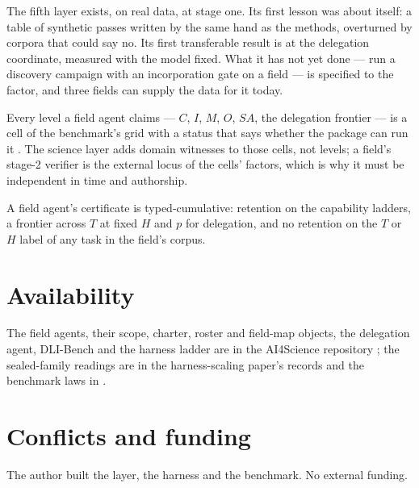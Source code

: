 \documentclass[11pt]{article}
\theoremstyle{definition}
\begin{document}
The fifth layer exists, on real data, at stage one. Its first lesson was about itself: a table of synthetic passes written by the same hand as the methods, overturned by corpora that could say no. Its first transferable result is at the delegation coordinate, measured with the model fixed. What it has not yet done --- run a discovery campaign with an incorporation gate on a field --- is specified to the factor, and three fields can supply the data for it today.

Every level a field agent claims --- $C$, $I$, $M$, $O$, $SA$, the delegation frontier --- is a cell of the benchmark's grid with a status that says whether the package can run it \citep{yang2026hilbenchpaper}. The science layer adds domain witnesses to those cells, not levels; a field's stage-2 verifier is the external locus of the cells' factors, which is why it must be independent in time and authorship.

A field agent's certificate is typed-cumulative: retention on the capability ladders, a frontier across $T$ at fixed $H$ and $p$ for delegation, and no retention on the $T$ or $H$ label of any task in the field's corpus.

\section*{Availability}

The field agents, their scope, charter, roster and field-map objects, the delegation agent, DLI-Bench and the harness ladder are in the AI4Science repository \citep{ai4science2026,ai4science_research_agents}; the sealed-family readings are in the harness-scaling paper's records and the benchmark laws in \citet{yang2026hilbench}.

\section*{Conflicts and funding}

The author built the layer, the harness and the benchmark. No external funding.



\end{document}
